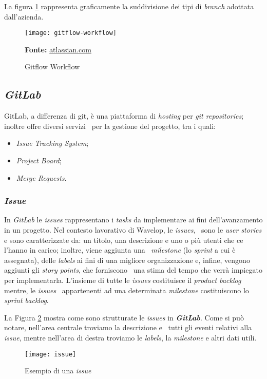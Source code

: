 La figura \ref{fig:gitflow} rappresenta graficamente la suddivisione dei tipi di \emph{branch} adottata dall'azienda.
\vspace{10pt}
  \begin{figure}[!ht]
    \begin{center}
      \texttt{[image: gitflow-workflow]}
      \caption{Gitflow Workflow}
      \textbf{Fonte:} \href{https://www.atlassian.com}{atlassian.com}
      \label{fig:gitflow}
    \end{center}
  \end{figure}
\vspace{10pt} 

\newpage
\subsection{\emph{GitLab}}
GitLab, a differenza di git, è una piattaforma di \emph{hosting} per \emph{git repositories}; inoltre offre diversi servizi \
per la gestione del progetto, tra i quali:

\begin{itemize}
  \item \emph{Issue Tracking System};
  \item \emph{Project Board};
  \item \emph{Merge Requests}.
\end{itemize}

\subsubsection{\emph{Issue}}
In \emph{GitLab} le \emph{issues} rappresentano i \emph{tasks} da implementare ai fini dell'avanzamento in un progetto. Nel contesto lavorativo di Wavelop, le \emph{issues}, \
sono le \emph{user stories} e sono caratterizzate da: un titolo, una descrizione e uno o più utenti che ce l'hanno in carico; inoltre, viene aggiunta una \
\emph{milestone} (lo \emph{sprint} a cui è assegnata), delle \emph{labels} ai fini di una migliore organizzazione e, infine, vengono aggiunti gli \emph{story points}, che forniscono \
una stima del tempo che verrà impiegato per implementarla. L'insieme di tutte le \emph{issues} costituisce il \emph{product backlog} mentre, le \emph{issues} \
appartenenti ad una determinata \emph{milestone} costituiscono lo \emph{sprint backlog}.

La Figura \ref{fig:issue} mostra come sono strutturate le \emph{issues} in \textbf{\emph{GitLab}}. Come si può notare, nell'area centrale troviamo la descrizione e \
tutti gli eventi relativi alla \emph{issue}, mentre nell'area di destra troviamo le \emph{labels}, la \emph{milestone} e altri dati utili.
\begin{figure}[!ht]
  \begin{center}
    \texttt{[image: issue]}
    \caption{Esempio di una \emph{issue}}
    \label{fig:issue}
  \end{center}
\end{figure}

